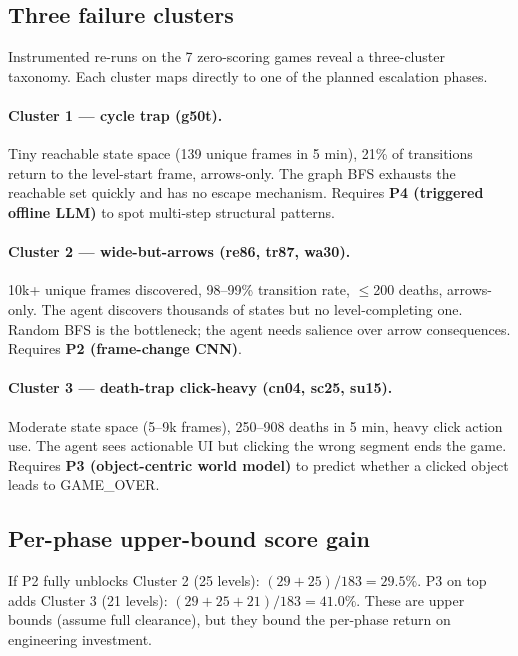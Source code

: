 \documentclass[10pt,letterpaper]{article}
\begin{document}
\subsection{Three failure clusters}\label{sec:analysis-clusters}

Instrumented re-runs on the 7 zero-scoring games reveal a three-cluster taxonomy.
Each cluster maps directly to one of the planned escalation phases.

\paragraph{Cluster 1 --- cycle trap (g50t).}
Tiny reachable state space (139 unique frames in 5 min), 21\% of transitions return to the level-start frame, arrows-only.
The graph BFS exhausts the reachable set quickly and has no escape mechanism.
Requires \textbf{P4 (triggered offline LLM)} to spot multi-step structural patterns.

\paragraph{Cluster 2 --- wide-but-arrows (re86, tr87, wa30).}
10k+ unique frames discovered, 98--99\% transition rate, $\leq$200 deaths, arrows-only.
The agent discovers thousands of states but no level-completing one.
Random BFS is the bottleneck; the agent needs salience over arrow consequences.
Requires \textbf{P2 (frame-change CNN)}.

\paragraph{Cluster 3 --- death-trap click-heavy (cn04, sc25, su15).}
Moderate state space (5--9k frames), 250--908 deaths in 5 min, heavy click action use.
The agent sees actionable UI but clicking the wrong segment ends the game.
Requires \textbf{P3 (object-centric world model)} to predict whether a clicked object leads to GAME\_OVER.

\subsection{Per-phase upper-bound score gain}

If P2 fully unblocks Cluster 2 (25 levels): $(29+25)/183 = 29.5\%$.
P3 on top adds Cluster 3 (21 levels): $(29+25+21)/183 = 41.0\%$.
These are upper bounds (assume full clearance), but they bound the per-phase return on engineering investment.
\end{document}
